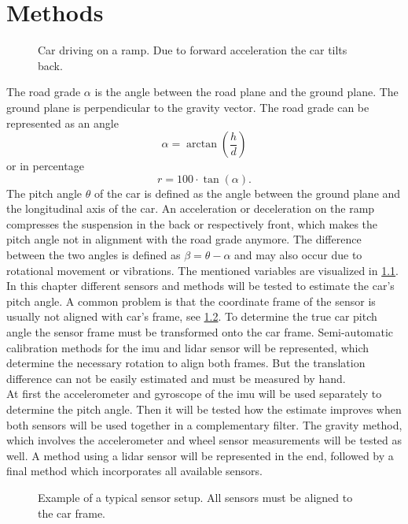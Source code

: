 \chapter{Methods}
\label{ch:Methods}
\begin{figure}[htpb]
	\centering
	
	\caption{Car driving on a ramp. Due to forward acceleration the car tilts back.}
	\label{fig:tikz_car_tilt}
\end{figure}
The road grade $\alpha$ is the angle between the road plane and the ground plane.
The ground plane is perpendicular to the gravity vector.
The road grade can be represented as an angle
\begin{equation}
	\alpha = \arctan(\frac{h}{d})
\end{equation}
or in percentage
\begin{equation}
	r = 100\cdot\tan(\alpha).
\end{equation}
The pitch angle $\theta$ of the car is defined as the angle between the ground plane and the longitudinal axis of the car.
An acceleration or deceleration on the ramp compresses the suspension in the back or respectively front, which makes the pitch angle not in alignment with the road grade anymore.
The difference between the two angles is defined as $\beta = \theta - \alpha$ and may also occur due to rotational movement or vibrations.
The mentioned variables are visualized in \cref{fig:tikz_car_tilt}.\\
In this chapter different sensors and methods will be tested to estimate the car's pitch angle.
A common problem is that the coordinate frame of the sensor is usually not aligned with car's frame, see \cref{fig:tikz_car_frames}.
To determine the true car pitch angle the sensor frame must be transformed onto the car frame.
Semi-automatic calibration methods for the \gls{imu} and \gls{lidar} sensor will be represented, which determine the necessary rotation to align both frames.
But the translation difference can not be easily estimated and must be measured by hand.\\
At first the accelerometer and gyroscope of the \gls{imu} will be used separately to determine the pitch angle.
Then it will be tested how the estimate improves when both sensors will be used together in a complementary filter.
The gravity method, which involves the accelerometer and wheel sensor measurements will be tested as well.
A method using a \gls{lidar} sensor will be represented in the end, followed by a final method which incorporates all available sensors.
\begin{figure}[htpb]
	\centering
	
	\caption{Example of a typical sensor setup. All sensors must be aligned to the car frame.}
	\label{fig:tikz_car_frames}
\end{figure}



